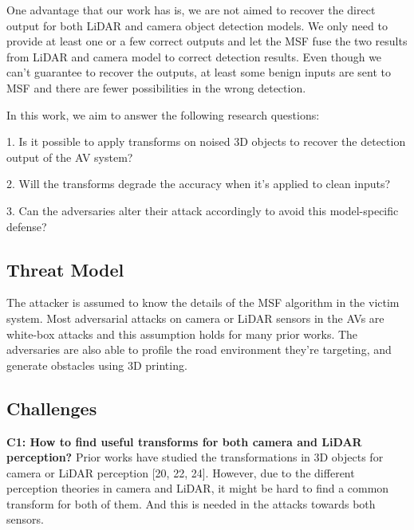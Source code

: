 
One advantage that our work has is, we are not aimed
to recover the direct output for both LiDAR and camera object detection models.
We only need to provide at least one or a few correct outputs and let the
MSF fuse the two results from LiDAR and camera model to correct detection results. 
Even though we can’t guarantee to recover the outputs, at least some benign inputs
are sent to MSF and there are fewer possibilities in the wrong detection.

In this work, we aim to answer the following research
questions:

1. Is it possible to apply transforms on noised 3D objects
to recover the detection output of the AV system?

2. Will the transforms degrade the accuracy when it’s applied to clean inputs?

3. Can the adversaries alter their attack accordingly to avoid
this model-specific defense?

\subsection{Threat Model}
The attacker is assumed to know the details of the MSF algorithm
in the victim system. Most adversarial attacks\cite{4, 7, 9, 19, 23}
on camera or LiDAR sensors in the AVs are white-box attacks
and this assumption holds for many prior works. The adversaries are also able to profile the road environment they’re
targeting, and generate obstacles using 3D printing.

\subsection{Challenges}
\textbf{C1: How to find useful transforms for both camera and
LiDAR perception?}
Prior works have studied the transformations in 3D objects
for camera or LiDAR perception [20, 22, 24]. However, due
to the different perception theories in camera and LiDAR, it
might be hard to find a common transform for both of them.
And this is needed in the attacks towards both sensors.

